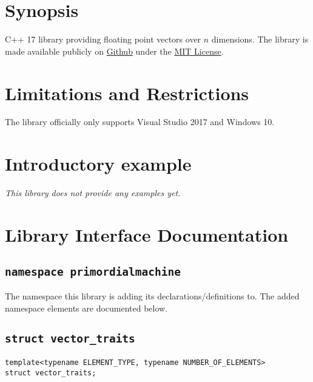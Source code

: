 \documentclass[oneside]{book}
\begin{document}
\frontmatter

\begin{titlepage}
\maketitle
\end{titlepage}

\tableofcontents
{}

\mainmatter

\chapter{Synopsis}
C++ 17 library providing floating point vectors over $n$ dimensions.
The library is made available publicly on
\href{\GetLibraryRepository}{Github}
under the
\href{\GetLibraryRepository/blob/master/LICENSE}{MIT License}.

\chapter{Limitations and Restrictions}
The library officially only supports Visual Studio 2017 and Windows 10.

\chapter{Introductory example}
\textit{\color{orange}This library does not provide any examples yet.}



\chapter{Library Interface Documentation}

\section{\texttt{namespace primordialmachine}}
The namespace this library is adding its declarations/definitions to.
The added namespace elements are documented below.



\section{\texttt{struct vector\_traits}}
\begin{verbatim}
template<typename ELEMENT_TYPE, typename NUMBER_OF_ELEMENTS>
struct vector_traits;
\end{verbatim}
\end{document}
